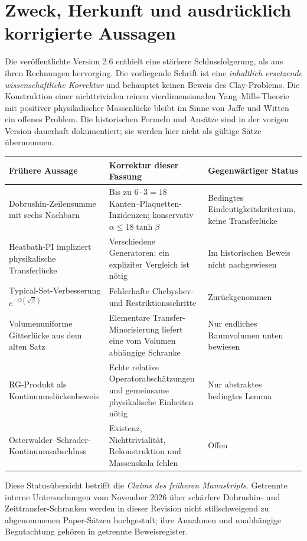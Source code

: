 \documentclass[11pt,a4paper]{article}
\theoremstyle{remark}
\begin{document}
\section{Zweck, Herkunft und ausdrücklich korrigierte Aussagen}
Die veröffentlichte Version 2.6 enthielt eine stärkere Schlussfolgerung,
als aus ihren Rechnungen hervorging. Die vorliegende Schrift ist eine
\emph{inhaltlich ersetzende wissenschaftliche Korrektur} und behauptet
keinen Beweis des Clay-Problems. Die Konstruktion einer nichttrivialen
reinen vierdimensionalen Yang--Mills-Theorie mit positiver physikalischer
Massenlücke bleibt im Sinne von Jaffe und Witten~\cite{JaffeWitten}
ein offenes Problem.
Die historischen Formeln und Ansätze sind in der vorigen Version
dauerhaft dokumentiert; sie werden hier nicht als gültige Sätze
übernommen.
\begin{center}\small
\begin{tabularx}{\textwidth}{@{}p{}YY@{}}
\toprule
Frühere Aussage & Korrektur dieser Fassung & Gegenwärtiger Status\\
\midrule
Dobrushin-Zeilensumme mit sechs Nachbarn &
Bis zu $6\cdot3=18$ Kanten--Plaquetten-Inzidenzen;
konservativ $\alpha\le18\tanh\beta$ &
Bedingtes Eindeutigkeitskriterium, keine Transferlücke\\
Heatbath-PI impliziert physikalische Transferlücke &
Verschiedene Generatoren; ein expliziter Vergleich ist nötig &
Im historischen Beweis nicht nachgewiesen\\
Typical-Set-Verbesserung $e^{-O(\sqrt\beta)}$ &
Fehlerhafte Chebyshev- und Restriktionsschritte &
Zurückgenommen\\
Volumenuniforme Gitterlücke aus dem alten Satz &
Elementare Transfer-Minorisierung liefert eine vom Volumen abhängige Schranke &
Nur endliches Raumvolumen unten bewiesen\\
RG-Produkt als Kontinuumslückenbeweis &
Echte relative Operatorabschätzungen und gemeinsame physikalische Einheiten nötig &
Nur abstraktes bedingtes Lemma\\
Osterwalder--Schrader-Kontinuumsabschluss &
Existenz, Nichttrivialität, Rekonstruktion und Massenskala fehlen &
Offen\\
\bottomrule
\end{tabularx}
\end{center}
Diese Statusübersicht betrifft die \emph{Claims des früheren Manuskripts}.
Getrennte interne Untersuchungen vom November 2026 über schärfere
Dobrushin- und Zeittransfer-Schranken werden in dieser Revision
nicht stillschweigend zu abgenommenen Paper-Sätzen hochgestuft;
ihre Annahmen und unabhängige Begutachtung gehören in getrennte
Beweisregister.
\end{document}
